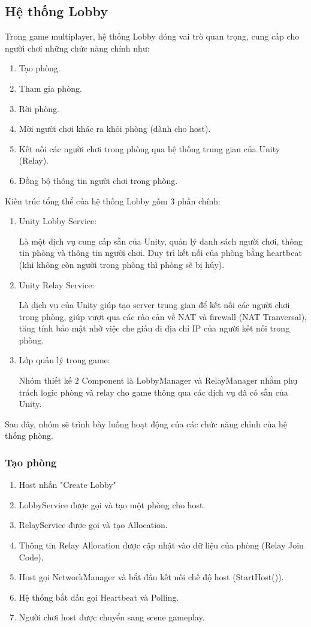 \subsection{Hệ thống Lobby}
Trong game multiplayer, hệ thống Lobby đóng vai trò quan trọng, cung cấp cho người chơi những chức năng chính như:
\begin{enumerate}[+]
    \item Tạo phòng.
    \item Tham gia phòng.
    \item Rời phòng.
    \item Mời người chơi khác ra khỏi phòng (dành cho host).
    \item Kết nối các người chơi trong phòng qua hệ thống trung gian của Unity (Relay).
    \item Đồng bộ thông tin người chơi trong phòng.
\end{enumerate}

Kiến trúc tổng thể của hệ thống Lobby gồm 3 phần chính:
\begin{enumerate}[$\bullet$]
    \item Unity Lobby Service:
    
    Là một dịch vụ cung cấp sẵn của Unity, quản lý danh sách người chơi, thông tin phòng và thông tin người chơi. Duy trì kết nối của phòng bằng heartbeat (khi không còn người trong phòng thì phòng sẽ bị hủy).
    \item Unity Relay Service:

    Là dịch vụ của Unity giúp tạo server trung gian để kết nối các người chơi trong phòng, giúp vượt qua các rào cản về NAT và firewall (NAT Tranversal), tăng tính bảo mật nhờ việc che giấu đi địa chỉ IP của người kết nối trong phòng.
    \item Lớp quản lý trong game:

    Nhóm thiết kế 2 Component là LobbyManager và RelayManager nhằm phụ trách logic phòng và relay cho game thông qua các dịch vụ đã có sẵn của Unity.
\end{enumerate}
    Sau đây, nhóm sẽ trình bày luồng hoạt động của các chức năng chỉnh của hệ thống phòng.
    
\subsubsection{Tạo phòng}
    \begin{enumerate}[-]
        \item Host nhấn "Create Lobby"
        \item LobbyService được gọi và tạo một phòng cho host.
        \item RelayService được gọi và tạo Allocation.
        \item Thông tin Relay Allocation được cập nhật vào dữ liệu của phòng (Relay Join Code).
        \item Host gọi NetworkManager và bắt đầu kết nối chế độ host (StartHost()).
        \item Hệ thống bắt đầu gọi Heartbeat và Polling.
        \item Người chơi host được chuyển sang scene gameplay.
    \end{enumerate}

